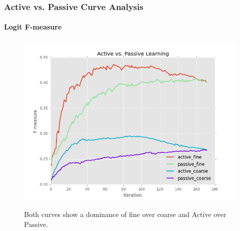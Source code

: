 \documentclass{beamer}
\begin{document}
\begin{frame}[noframenumbering]
    \frametitle{Active vs. Passive Curve Analysis}
    \framesubtitle{Logit F-measure}
    \begin{figure}[!htb]
        \centering
        \includegraphics[width=0.70\columnwidth]{fig/runActPassLogReg_f1}
        \label{fig:runActPassLogReg_f1}
        \caption{Both curves show a dominance of fine over coarse and
Active over Passive.}
    \end{figure}
\end{frame}
\end{document}
